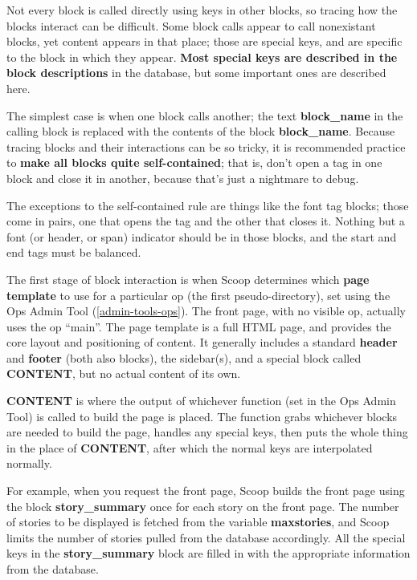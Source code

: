 Not every block is called directly using keys in other blocks, so tracing how the blocks interact can be difficult.  Some block calls appear to call nonexistant blocks, yet content appears in that place; those are special keys, and are specific to the block in which they appear.  {\bf Most special keys are described in the block descriptions} in the database, but some important ones are described here.

The simplest case is when one block calls another; the text {\bf \latexhtml{$\vert$}{|}block\_name\latexhtml{$\vert$}{|}} in the calling block is replaced with the contents of the block {\bf block\_name}.  Because tracing blocks and their interactions can be so tricky, it is recommended practice to {\bf make all blocks quite self-contained}; that is, don't open a tag in one block and close it in another, because that's just a nightmare to debug. 

The exceptions to the self-contained rule are things like the font tag blocks; those come in pairs, one that opens the tag and the other that closes it. Nothing but a font (or header, or span) indicator should be in those blocks, and the start and end tags must be balanced.

The first stage of block interaction is when Scoop determines which {\bf page template} to use for a particular op (the first pseudo-directory), set using the Ops Admin Tool (\ref{admin-tools-ops}).  The front page, with no visible op, actually uses the op ``main''.  The page template is a full HTML page, and provides the core layout and positioning of content.  It generally includes a standard {\bf header} and {\bf footer} (both also blocks), the sidebar(s), and a special block called {\bf CONTENT}, but no actual content of its own.

{\bf CONTENT} is where the output of whichever function (set in the Ops Admin Tool) is called to build the page is placed.  The function grabs whichever blocks are needed to build the page, handles any special keys, then puts the whole thing in the place of {\bf \latexhtml{$\vert$}{|}CONTENT\latexhtml{$\vert$}{|}}, after which the normal keys are interpolated normally.

For example, when you request the front page, Scoop builds the front page using the block {\bf story\_summary} once for each story on the front page.  The number of stories to be displayed is fetched from the variable {\bf maxstories}, and Scoop limits the number of stories pulled from the database accordingly.  All the special keys in the {\bf story\_summary} block are filled in with the appropriate information from the database.

